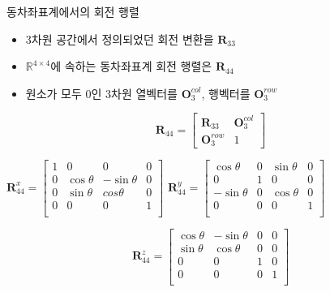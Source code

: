 \begin{frame}{동차좌표계에서의 회전 행렬}

\begin{itemize}
\item 3차원 공간에서 정의되었던 회전 변환을 $\mathbf R_{33}$
\item $\mathbb R^{4 \times 4}$에 속하는 동차좌표계 회전 행렬은 $\mathbf R_{44}$
\item 원소가 모두 0인 3차원 열벡터를 $\mathbf O_3^{col}$, 행벡터를 $\mathbf O_3^{row}$
\end{itemize}

$$\mathbf R_{44} = 
\left [
\begin{array}{cc}
\mathbf R_{33} & \mathbf O_3^{col} \\
\mathbf O_3^{row} & 1
\end{array}
\right ]
$$

$
\mathbf R_{44}^x =
\left [
\begin{array}{cccc}
 1 & 0 & 0 & 0 \\
 0 & \cos \theta & -\sin \theta &  0\\
 0  & \sin \theta & cos \theta & 0 \\
 0 & 0 & 0 & 1 \\
\end{array}
\right ]
$
$
\mathbf R_{44}^y =
\left [
\begin{array}{cccc}
 \cos \theta & 0 & \sin \theta & 0 \\
 0 & 1 & 0 & 0 \\
- \sin \theta & 0  & \cos \theta & 0 \\
 0 & 0 & 0 & 1\\
\end{array}
\right ]
$

$$
\mathbf R_{44}^z =
\left [
\begin{array}{cccc}
 \cos \theta & - \sin \theta & 0 & 0 \\
 \sin \theta  & \cos \theta & 0 & 0 \\
 0 & 0 & 1 & 0 \\
 0 & 0 & 0 & 1\\
\end{array}
\right ]
$$



\end{frame}

